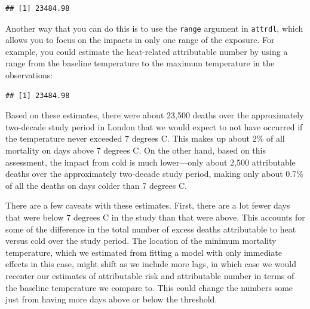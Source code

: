 \documentclass[
]{book}
\newenvironment{Shaded}{\begin{snugshade}}{\end{snugshade}}
\newcommand{\AttributeTok}[1]{\textcolor[rgb]{0.77,0.63,0.00}{#1}}
\newcommand{\DecValTok}[1]{\textcolor[rgb]{0.00,0.00,0.81}{#1}}
\newcommand{\FunctionTok}[1]{\textcolor[rgb]{0.00,0.00,0.00}{#1}}
\newcommand{\NormalTok}[1]{#1}
\newcommand{\SpecialCharTok}[1]{\textcolor[rgb]{0.00,0.00,0.00}{#1}}
\newcommand{\StringTok}[1]{\textcolor[rgb]{0.31,0.60,0.02}{#1}}
\begin{document}
\begin{verbatim}
## [1] 23484.98
\end{verbatim}

Another way that you can do this is to use the \texttt{range} argument in \texttt{attrdl}, which allows you to focus on the impacts in only one range of the exposure. For example, you could estimate the heat-related attributable number by using a range from the baseline temperature to the maximum temperature in the observations:

\begin{Shaded}
\end{Shaded}

\begin{verbatim}
## [1] 23484.98
\end{verbatim}

Based on these estimates, there were about 23,500 deaths over the approximately two-decade study period in London that we would expect to not have occurred if the temperature never exceeded 7 degrees C. This makes up about 2\% of all mortality on days above 7 degrees C. On the other hand, based on this assessment, the impact from cold is much lower---only about 2,500 attributable deaths over the approximately two-decade study period, making only about 0.7\% of all the deaths on days colder than 7 degrees C.

There are a few caveats with these estimates. First, there are a lot fewer days that were below 7 degrees C in the study than that were above. This accounts for some of the difference in the total number of excess deaths attributable to heat versus cold over the study period. The location of the minimum mortality temperature, which we estimated from fitting a model with only immediate effects in this case, might shift as we include more lags, in which case we would recenter our estimates of attributable risk and attributable number in terms of the baseline temperature we compare to. This could change the numbers some just from having more days above or below the threshold.
\end{document}
